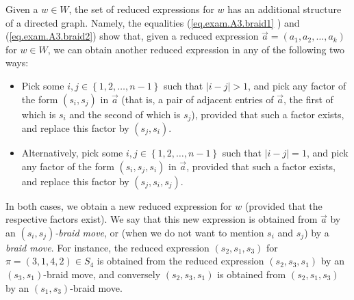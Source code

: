 \documentclass
[numbers=enddot,12pt,final,onecolumn,notitlepage,abstracton]{scrartcl}%
\theoremstyle{definition}
\begin{document}
Given a $w\in W$, the set of reduced expressions for $w$ has an additional
structure of a directed graph. Namely, the equalities (\ref{eq.exam.A3.braid1}%
) and (\ref{eq.exam.A3.braid2}) show that, given a reduced expression
$\overrightarrow{a}=\left(  a_{1},a_{2},\ldots,a_{k}\right)  $ for $w\in W$,
we can obtain another reduced expression in any of the following two ways:

\begin{itemize}
\item Pick some $i,j\in\left\{  1,2,\ldots,n-1\right\}  $ such that
$\left\vert i-j\right\vert >1$, and pick any factor of the form $\left(
s_{i},s_{j}\right)  $ in $\overrightarrow{a}$ (that is, a pair of adjacent
entries of $\overrightarrow{a}$, the first of which is $s_{i}$ and the second
of which is $s_{j}$), provided that such a factor exists, and replace this
factor by $\left(  s_{j},s_{i}\right)  $.

\item Alternatively, pick some $i,j\in\left\{  1,2,\ldots,n-1\right\}  $ such
that $\left\vert i-j\right\vert =1$, and pick any factor of the form $\left(
s_{i},s_{j},s_{i}\right)  $ in $\overrightarrow{a}$, provided that such a
factor exists, and replace this factor by $\left(  s_{j},s_{i},s_{j}\right)  $.
\end{itemize}

In both cases, we obtain a new reduced expression for $w$ (provided that the
respective factors exist). We say that this new expression is obtained from
$\overrightarrow{a}$ by an $\left(  s_{i},s_{j}\right)  $\emph{-braid move},
or (when we do not want to mention $s_{i}$ and $s_{j}$) by a \emph{braid
move}. For instance, the reduced expression $\left(  s_{2},s_{1},s_{3}\right)
$ for $\pi=\left(  3,1,4,2\right)  \in S_{4}$ is obtained from the reduced
expression $\left(  s_{2},s_{3},s_{1}\right)  $ by an $\left(  s_{3}%
,s_{1}\right)  $-braid move, and conversely $\left(  s_{2},s_{3},s_{1}\right)
$ is obtained from $\left(  s_{2},s_{1},s_{3}\right)  $ by an $\left(
s_{1},s_{3}\right)  $-braid move.
\end{document}
